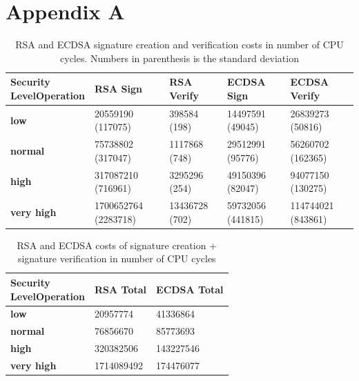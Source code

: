
\chapter{Appendix A}

\begin{table}[]
	\begin{tabular}{|l|l|l|l|l|}
	\hline
	\backslashbox{Security\\Level}{Operation}                  & \textbf{RSA Sign}    & \textbf{RSA Verify} & \textbf{ECDSA Sign} & \textbf{ECDSA Verify} \\ \hline
	\textbf{low}       & 20559190 (117075)    & 398584 (198)        & 14497591 (49045)    & 26839273 (50816)      \\ \hline
	\textbf{normal}    & 75738802 (317047)    & 1117868 (748)       & 29512991 (95776)    & 56260702 (162365)     \\ \hline
	\textbf{high}      & 317087210 (716961)   & 3295296 (254)       & 49150396 (82047)     & 94077150 (130275)     \\ \hline
	\textbf{very high} & 1700652764 (2283718) & 13436728 (702)      & 59732056 (441815)   & 114744021 (843861)    \\ \hline
	\end{tabular}
	\centering \caption{\label{table:rsa-costs-all-sls} RSA and ECDSA signature creation and verification costs in number of CPU cycles. Numbers in parenthesis is the standard deviation} \end{table}
  
  \begin{table}[]
	\begin{tabular}{|l|l|l|}
	\hline
	\backslashbox{Security\\Level}{Operation}                   & \textbf{RSA Total} & \textbf{ECDSA Total} \\ \hline
	\textbf{low}       & 20957774           & 41336864             \\ \hline
	\textbf{normal}    & 76856670           & 85773693             \\ \hline
	\textbf{high}      & 320382506          & 143227546            \\ \hline
	\textbf{very high} & 1714089492         & 174476077            \\ \hline
	\end{tabular}
	\centering \caption{\label{table:rsa-costs-all-sls-total} RSA and ECDSA costs of signature creation + signature verification in number of CPU cycles}
  \end{table}
  
